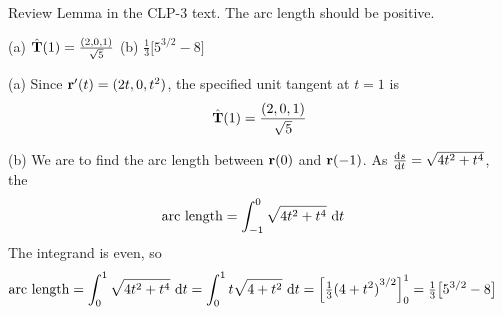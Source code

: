 \begin{hint} 
Review Lemma  in the CLP-3 text.
The arc length should be positive.
\end{hint}

\begin{answer} 
(a) $\hat{\mathbf{T}}(1) = \frac{(2,0,1)}{\sqrt{5}}$\qquad
(b) $\frac{1}{3}\big[5^{3/2}-8\big]$
\end{answer}

\begin{solution} (a)
Since $\mathbf{r}'(t) = (2t,0,t^2)$, the specified unit tangent at $t=1$ is
\begin{equation*}
\hat{\mathbf{T}}(1) = \frac{(2,0,1)}{\sqrt{5}}
\end{equation*}

\noindent (b)
We are to find the arc length between $\mathbf{r}(0)$ and $\mathbf{r}(-1)$. 
As $\diff{s}{t}=\sqrt{4t^2+t^4}$, the 
\begin{align*}
\text{arc length} &= \int_{-1}^0 \sqrt{4t^2+t^4}\ \mathrm{d}t
\end{align*}
The integrand is even, so
\begin{align*}
\text{arc length} &= \int_0^1 \sqrt{4t^2+t^4}\ \mathrm{d}t
=\int_0^1 t\sqrt{4+t^2}\ \mathrm{d}t
=\Big[\tfrac{1}{3}{(4+t^2)}^{3/2}\Big]_0^1
=\tfrac{1}{3}\big[5^{3/2}-8\big]
\end{align*}

\end{solution}



